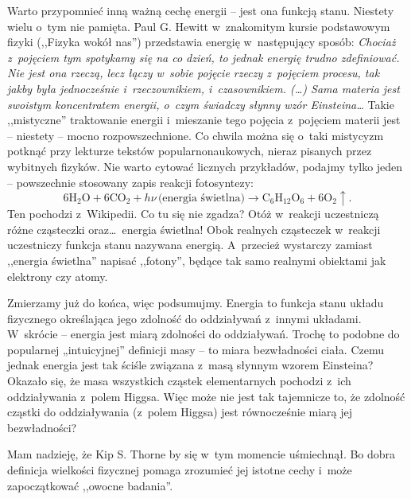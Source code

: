 \vspace*{\parskip}
\begin{dwieszpalty}Warto przypomnieć inną ważną cechę energii – jest ona funkcją stanu. Niestety wielu o~tym nie pamięta. Paul G. Hewitt w~znakomitym kursie podstawowym fizyki (,,Fizyka wokół nas'') przedstawia energię w~następujący sposób: \emph{Chociaż z~pojęciem tym spotykamy się na co dzień, to jednak energię trudno zdefiniować. Nie jest ona rzeczą, lecz łączy w~sobie pojęcie rzeczy z~pojęciem procesu, tak jakby była jednocześnie i~rzeczownikiem, i~czasownikiem. (\dots) Sama materia jest swoistym koncentratem energii, o~czym świadczy słynny wzór Einsteina\ldots} Takie ,,mistyczne'' traktowanie energii i~mieszanie tego pojęcia z~pojęciem materii jest – niestety – mocno rozpowszechnione. Co chwila można się o~taki mistycyzm potknąć przy lekturze tekstów popularnonaukowych, nieraz pisanych przez wybitnych fizyków. Nie warto cytować licznych przykładów, podajmy tylko jeden – powszechnie stosowany zapis reakcji fotosyntezy:
$$
6\mathrm{H_2O+6CO_2}+h\nu\, \mbox{(energia świetlna)}\rightarrow \mathrm{C_6H_{12}O_6+6 O_2}\!\!\uparrow.
$$
Ten pochodzi z~Wikipedii. Co tu się nie zgadza? Otóż w~reakcji uczestniczą różne cząsteczki oraz\ldots\ energia świetlna!  Obok realnych cząsteczek w~reakcji uczestniczy funkcja stanu nazywana energią. A~przecież wystarczy zamiast ,,energia świetlna'' napisać ,,fotony'', będące tak samo realnymi obiektami jak elektrony czy atomy.

Zmierzamy już do końca, więc podsumujmy. Energia to funkcja stanu układu fizycznego określająca jego zdolność do oddziaływań z~innymi układami. W~skrócie – energia jest miarą zdolności do oddziaływań. Trochę to podobne do popularnej „intuicyjnej” definicji masy – to miara bezwładności ciała. Czemu jednak energia jest tak ściśle związana z~masą słynnym wzorem Einsteina? Okazało się, że masa wszystkich cząstek elementarnych pochodzi z~ich oddziaływania z~polem Higgsa. Więc może nie jest tak tajemnicze to, że zdolność cząstki do oddziaływania (z~polem Higgsa) jest równocześnie miarą jej bezwładności?

Mam nadzieję, że Kip S. Thorne by się w~tym momencie uśmiechnął. Bo dobra definicja wielkości fizycznej pomaga zrozumieć jej istotne cechy i~może zapoczątkować ,,owocne badania''.




\end{dwieszpalty}
